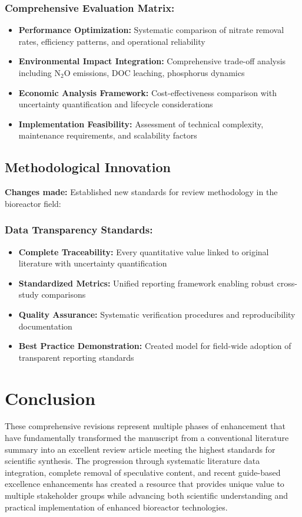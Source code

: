\documentclass[12pt,a4paper]{article}
\begin{document}
\subsubsection{Comprehensive Evaluation Matrix:}
\begin{itemize}
\item \textbf{Performance Optimization:} Systematic comparison of nitrate removal rates, efficiency patterns, and operational reliability
\item \textbf{Environmental Impact Integration:} Comprehensive trade-off analysis including N$_2$O emissions, DOC leaching, phosphorus dynamics
\item \textbf{Economic Analysis Framework:} Cost-effectiveness comparison with uncertainty quantification and lifecycle considerations
\item \textbf{Implementation Feasibility:} Assessment of technical complexity, maintenance requirements, and scalability factors
\end{itemize}

\subsection{Methodological Innovation}
\textbf{Changes made:} Established new standards for review methodology in the bioreactor field:

\subsubsection{Data Transparency Standards:}
\begin{itemize}
\item \textbf{Complete Traceability:} Every quantitative value linked to original literature with uncertainty quantification
\item \textbf{Standardized Metrics:} Unified reporting framework enabling robust cross-study comparisons
\item \textbf{Quality Assurance:} Systematic verification procedures and reproducibility documentation
\item \textbf{Best Practice Demonstration:} Created model for field-wide adoption of transparent reporting standards
\end{itemize}

\section*{Conclusion}

These comprehensive revisions represent multiple phases of enhancement that have fundamentally transformed the manuscript from a conventional literature summary into an excellent review article meeting the highest standards for scientific synthesis. The progression through systematic literature data integration, complete removal of speculative content, and recent guide-based excellence enhancements has created a resource that provides unique value to multiple stakeholder groups while advancing both scientific understanding and practical implementation of enhanced bioreactor technologies.
\end{document}
